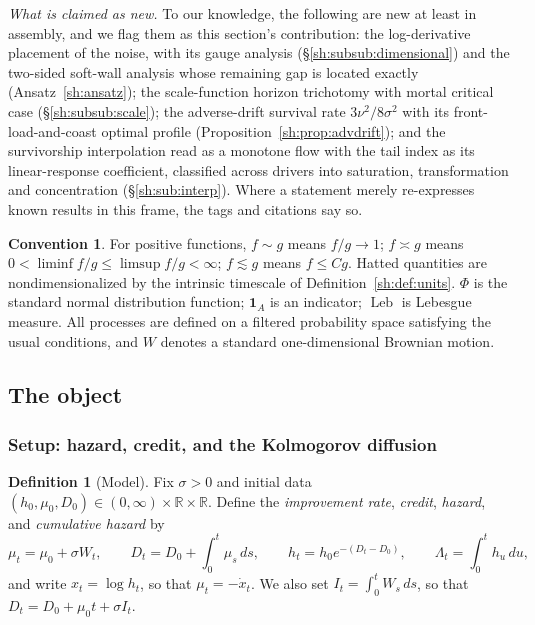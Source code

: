 \documentclass[11pt]{article}
\numberwithin{equation}{section}
\theoremstyle{plain}
\theoremstyle{definition}
\newtheorem{definition}[theorem]{Definition}
\newtheorem{convention}[theorem]{Convention}
\theoremstyle{remark}
\newcommand{\R}{\mathbb{R}}
\DeclareMathOperator{\Leb}{Leb}
\newcommand{\one}{\mathbf{1}}
\begin{document}
\emph{What is claimed as new.} To our knowledge, the following are new
at least in assembly, and we flag them as this section's contribution:
the log-derivative placement of the noise, with its gauge analysis
(\S\ref{sh:subsub:dimensional}) and the two-sided soft-wall analysis
whose remaining gap is located exactly (Ansatz~\ref{sh:ansatz}); the
scale-function horizon trichotomy with mortal critical case
(\S\ref{sh:subsub:scale}); the adverse-drift survival rate
$3\nu^2/8\sigma^2$ with its front-load-and-coast optimal profile
(Proposition~\ref{sh:prop:advdrift}); and the survivorship
interpolation read as a monotone flow with the tail index as its
linear-response coefficient, classified across drivers into saturation,
transformation and concentration (\S\ref{sh:sub:interp}). Where a
statement merely re-expresses known results in this frame, the tags and
citations say so.

\begin{convention}\label{sh:conv}
For positive functions, $f\sim g$ means $f/g\to1$; $f\asymp g$ means
$0<\liminf f/g\le\limsup f/g<\infty$; $f\lesssim g$ means $f\le Cg$.
Hatted quantities are nondimensionalized by the intrinsic timescale of
Definition~\ref{sh:def:units}. $\Phi$ is the standard normal distribution
function; $\one_A$ is an indicator; $\Leb$ is Lebesgue measure. All processes
are defined on a filtered probability space satisfying the usual conditions,
and $W$ denotes a standard one-dimensional Brownian motion.
\end{convention}

\subsection{The object}\label{gr1:sub:object}\label{tc:sub:model}\label{sh:sub:model}


\subsubsection{Setup: hazard, credit, and the Kolmogorov diffusion}
\label{sh:subsub:setup}

\begin{definition}[Model]\label{sh:def:model}
Fix $\sigma>0$ and initial data $(h_0,\mu_0,D_0)\in(0,\infty)\times\R\times\R$.
Define the \emph{improvement rate}, \emph{credit}, \emph{hazard}, and
\emph{cumulative hazard} by
\begin{equation}\label{sh:eq:model}
\mu_t=\mu_0+\sigma W_t,\qquad
D_t=D_0+\int_0^t\mu_s\,ds,\qquad
h_t=h_0e^{-(D_t-D_0)},\qquad
\Lambda_t=\int_0^t h_u\,du,
\end{equation}
and write $x_t=\log h_t$, so that $\mu_t=-\dot x_t$. We also set
$I_t=\int_0^t W_s\,ds$, so that $D_t=D_0+\mu_0t+\sigma I_t$.
\end{definition}
\end{document}
